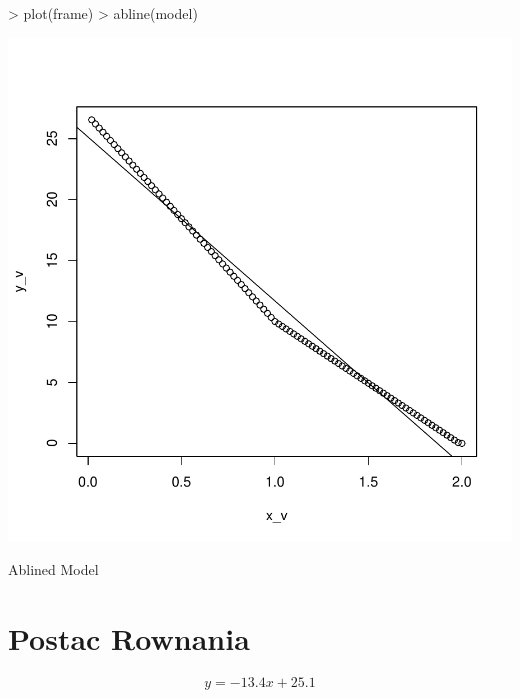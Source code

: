 \documentclass{article}
\begin{document}
\begin{centerfig}
\begin{Schunk}
\begin{Sinput}
> plot(frame)
> abline(model)
\end{Sinput}
\end{Schunk}
\includegraphics{Report-014}
\caption{Ablined Model}
\end{centerfig}


\section{Postac Rownania}
\[y = -13.4x + 25.1\]
\end{document}
